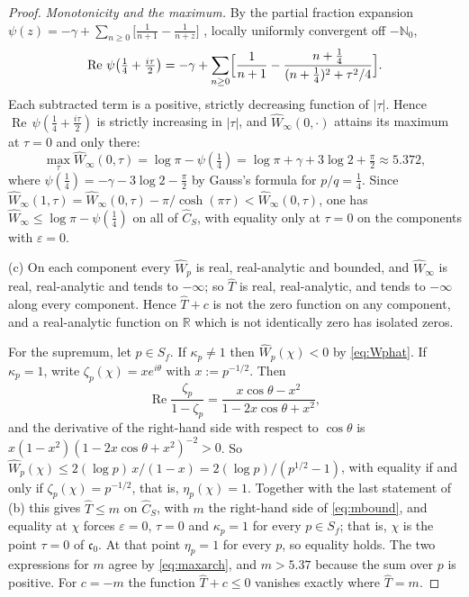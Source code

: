 \documentclass[11pt]{amsart}
\theoremstyle{definition}
\theoremstyle{remark}
\newcommand{\R}{\mathbb R}
\newcommand{\N}{\mathbb N}
\newcommand{\Rel}{\operatorname{Re}}
\newcommand{\Th}{\widehat{T}}
\newcommand{\Wh}{\widehat{W}}
\newcommand{\Ch}{\widehat{C}_S}
\begin{document}
\begin{proof}
\emph{Monotonicity and the maximum.}  By the partial fraction expansion
$\psi(z)=-\gamma+\sum_{n\ge0}\bigl[\tfrac1{n+1}-\tfrac1{n+z}\bigr]$
\cite[(5.7.6)]{DLMF}, locally uniformly convergent off $-\N_0$,
\[
\Rel\,\psi\bigl(\tfrac14+\tfrac{i\tau}{2}\bigr)
=-\gamma+\sum_{n\ge0}\Bigl[\frac1{n+1}
-\frac{n+\tfrac14}{(n+\tfrac14)^{2}+\tau^{2}/4}\Bigr].
\]
Each subtracted term is a positive, strictly decreasing function of $|\tau|$.
Hence $\Rel\,\psi(\tfrac14+\tfrac{i\tau}{2})$ is strictly increasing in
$|\tau|$, and $\Wh_{\infty}(0,\cdot)$ attains its maximum at $\tau=0$ and only
there:
\begin{equation}\label{eq:maxarch}
\max_{\tau}\Wh_{\infty}(0,\tau)=\log\pi-\psi(\tfrac14)
=\log\pi+\gamma+3\log2+\tfrac{\pi}{2}\approx5.372 ,
\end{equation}
where $\psi(\tfrac14)=-\gamma-3\log2-\tfrac{\pi}{2}$ by Gauss's formula
\cite[(5.4.19)]{DLMF} for $p/q=\tfrac14$.  Since
$\Wh_{\infty}(1,\tau)=\Wh_{\infty}(0,\tau)-\pi/\cosh(\pi\tau)<
\Wh_{\infty}(0,\tau)$, one has $\Wh_{\infty}\le\log\pi-\psi(\tfrac14)$ on all
of $\Ch$, with equality only at $\tau=0$ on the components with
$\varepsilon=0$.

(c)  On each component every $\Wh_p$ is real, real-analytic and bounded, and
$\Wh_{\infty}$ is real, real-analytic and tends to $-\infty$; so $\Th$ is real,
real-analytic, and tends to $-\infty$ along every component.  Hence $\Th+c$ is
not the zero function on any component, and a real-analytic function on $\R$
which is not identically zero has isolated zeros.

For the supremum, let $p\in S_f$.  If $\kappa_p\ne1$ then $\Wh_p(\chi)<0$ by
\eqref{eq:Wphat}.  If $\kappa_p=1$, write $\zeta_p(\chi)=xe^{i\theta}$ with
$x:=p^{-1/2}$.  Then
\[
\Rel\frac{\zeta_p}{1-\zeta_p}=\frac{x\cos\theta-x^{2}}{1-2x\cos\theta+x^{2}},
\]
and the derivative of the right-hand side with respect to $\cos\theta$ is
$x(1-x^{2})(1-2x\cos\theta+x^{2})^{-2}>0$.  So
$\Wh_p(\chi)\le2(\log p)\,x/(1-x)=2(\log p)/(p^{1/2}-1)$, with equality if and
only if $\zeta_p(\chi)=p^{-1/2}$, that is, $\eta_p(\chi)=1$.  Together with
the last statement of (b) this gives $\Th\le m$ on $\Ch$, with $m$ the
right-hand side of \eqref{eq:mbound}, and equality at $\chi$ forces
$\varepsilon=0$, $\tau=0$ and $\kappa_p=1$ for every $p\in S_f$; that is,
$\chi$ is the point $\tau=0$ of $\mathfrak c_0$.  At that point $\eta_p=1$ for
every $p$, so equality holds.  The two expressions for $m$ agree by
\eqref{eq:maxarch}, and $m>5.37$ because the sum over $p$ is positive.  For
$c=-m$ the function $\Th+c\le0$ vanishes exactly where $\Th=m$.


\end{proof}
\end{document}
